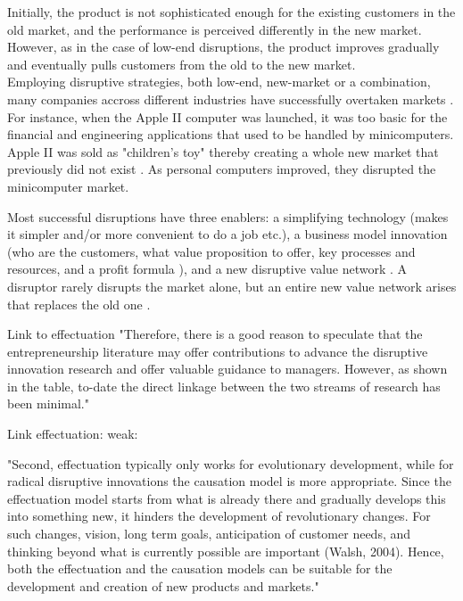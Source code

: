 \documentclass[a4paper,10pt]{book}
\begin{document}
Initially, the product is not sophisticated enough for the existing customers in the old market, 
and the performance is perceived differently in the new market. However, as in the case of low-end disruptions, the product improves
gradually and eventually pulls customers from the old to the new market.\\

Employing disruptive strategies, both low-end, new-market or a combination, many companies accross different industries 
have successfully overtaken markets \cite{innovatorsSolution}. For instance, when the Apple II computer was launched, it was too basic 
for the financial and engineering applications that used to be handled by minicomputers. Apple II was sold as "children's toy" thereby 
creating a whole new market that previously did not exist \cite{disruptionInEducation}. 
As personal computers improved, they disrupted the minicomputer market. 

Most successful disruptions have three enablers: 
a simplifying technology (makes it simpler and/or more convenient to do a job etc.), a business model innovation (who are the customers, 
what value proposition to offer, key processes and resources, and a profit formula \cite{reinvetingBusinessModel}), and a new disruptive 
value network \cite{pressArticleHbsReviveHealthCareInnovation}. A disruptor rarely disrupts the market alone, but an entire new value 
network arises that replaces the old one \cite{DisruptingClassExpandedEdition}\cite{pressArticleHbsReviveHealthCareInnovation}. 




Link to effectuation
"Therefore, there is a good reason to speculate
that the entrepreneurship literature may offer contributions to advance the disruptive innovation
research and offer valuable guidance to managers. However, as shown in the table, to-date the direct
linkage between the two streams of research has been minimal." \cite{managingDisruptiveInnovation}



Link effectuation: weak:

"Second, effectuation typically only works for evolutionary development, while for
radical disruptive innovations the causation model is more appropriate. Since the effectuation
model starts from what is already there and gradually develops this into something new, it
hinders the development of revolutionary changes. For such changes, vision, long term goals,
anticipation of customer needs, and thinking beyond what is currently possible are important
(Walsh, 2004). Hence, both the effectuation and the causation models can be suitable for the
development and creation of new products and markets." \cite{}
\end{document}
